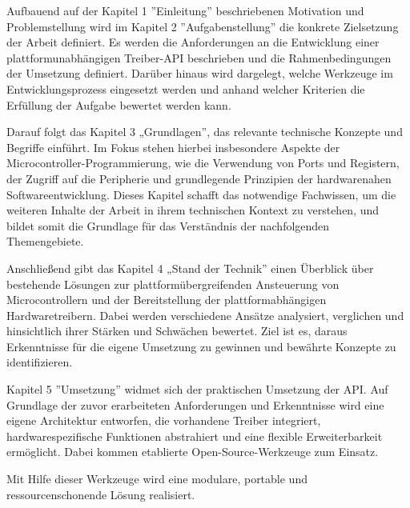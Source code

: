 Aufbauend auf der Kapitel 1 ''Einleitung'' beschriebenen Motivation und Problemstellung wird im Kapitel 2 ''Aufgabenstellung'' die konkrete Zielsetzung der Arbeit definiert.
Es werden die Anforderungen an die Entwicklung einer plattformunabhängigen Treiber-API beschrieben und die Rahmenbedingungen der Umsetzung definiert.
Darüber hinaus wird dargelegt, welche Werkzeuge im Entwicklungsprozess eingesetzt werden und anhand welcher Kriterien die Erfüllung der Aufgabe bewertet werden kann.

Darauf folgt das Kapitel 3 „Grundlagen”, das relevante technische Konzepte und Begriffe einführt. 
Im Fokus stehen hierbei insbesondere Aspekte der Microcontroller-Programmierung, wie die Verwendung von Ports und Registern, der Zugriff auf die Peripherie und grundlegende Prinzipien der hardwarenahen Softwareentwicklung. 
Dieses Kapitel schafft das notwendige Fachwissen, um die weiteren Inhalte der Arbeit in ihrem technischen Kontext zu verstehen, und bildet somit die Grundlage für das Verständnis der nachfolgenden Themengebiete.

Anschließend gibt das Kapitel 4 „Stand der Technik” einen Überblick über bestehende Lösungen zur plattformübergreifenden Ansteuerung von Microcontrollern und der Bereitstellung der plattformabhängigen Hardwaretreibern.
Dabei werden verschiedene Ansätze analysiert, verglichen und hinsichtlich ihrer Stärken und Schwächen bewertet. 
Ziel ist es, daraus Erkenntnisse für die eigene Umsetzung zu gewinnen und bewährte Konzepte zu identifizieren.

Kapitel 5 ''Umsetzung'' widmet sich der praktischen Umsetzung der API.
Auf Grundlage der zuvor erarbeiteten Anforderungen und Erkenntnisse wird eine eigene Architektur entworfen, die vorhandene Treiber integriert, hardwarespezifische Funktionen abstrahiert und eine flexible Erweiterbarkeit ermöglicht.
Dabei kommen etablierte Open-Source-Werkzeuge zum Einsatz.

Mit Hilfe dieser Werkzeuge wird eine modulare, portable und ressourcenschonende Lösung realisiert.






















